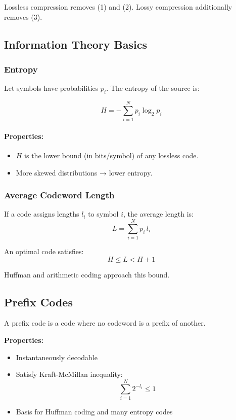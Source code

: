 \documentclass{AnantDocumentation}
\begin{document}
Lossless compression removes (1) and (2).  
Lossy compression additionally removes (3).

\subsection{Information Theory Basics}

\subsubsection{Entropy}

Let symbols have probabilities \(p_i\).  
The entropy of the source is:

\begin{equation}
H = - \sum_{i=1}^{N} p_i \log_2 p_i
\end{equation}

\paragraph{Properties:}
\begin{itemize}
\item \(H\) is the lower bound (in bits/symbol) of any lossless code.
\item More skewed distributions → lower entropy.
\end{itemize}

\subsubsection{Average Codeword Length}

If a code assigns lengths \(l_i\) to symbol \(i\), the average length is:
\begin{equation}
L = \sum_{i=1}^{N} p_i \, l_i
\end{equation}

An optimal code satisfies:
\[
H \leq L < H + 1
\]

Huffman and arithmetic coding approach this bound.

\subsection{Prefix Codes}

A prefix code is a code where no codeword is a prefix of another.

\textbf{Properties:}
\begin{itemize}
\item Instantaneously decodable  
\item Satisfy Kraft-McMillan inequality:
\[
\sum_{i=1}^{N} 2^{-l_i} \leq 1
\]
\item Basis for Huffman coding and many entropy codes
\end{itemize}
\end{document}
